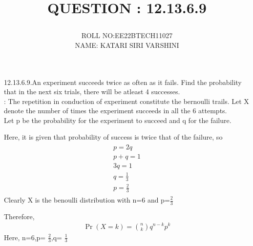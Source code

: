 \documentclass[journal,12pt,twocolumn]{IEEEtran}
\begin{document}
\let\vec\mathbf




\vspace{3cm}

\title{

\textbf{QUESTION : 12.13.6.9} 

}
\author{ ROLL NO:EE22BTECH11027\\
         NAME: KATARI SIRI VARSHINI
	}
	
	

\maketitle

\newpage


\bigskip

\renewcommand{\thefigure}{\theenumi}
\renewcommand{\thetable}{\theenumi}
12.13.6.9.An experiment succeeds twice as often as it fails. Find the probability that in the next six trials, there will be atleast 4 successes.
\\ \solution:
The repetition in conduction of experiment constitute the bernoulli trails. Let X denote the number of times the experiment succeeds in all the 6 attempts.\\
Let p be the probability for the experiment to succeed and q for the failure.

Here, it is given that probability of success is twice that of the failure, so 
\begin{align}
\begin{split}
p=2q\\
p+q=1\\
3q=1\\
q= \frac{1}{3}\\
p= \frac{2}{3}
\end{split}
\end{align} 
Clearly X is the benoulli distribution with n=6 and p=$\frac{2}{3}$

Therefore,
\begin{align}
\Pr(X=k) = \binom{n}{k}q^{n-k}p^{k}
\end{align}
Here, n=6,p= $\frac{2}{3}$,q= $\frac{1}{3}$
\end{document}
